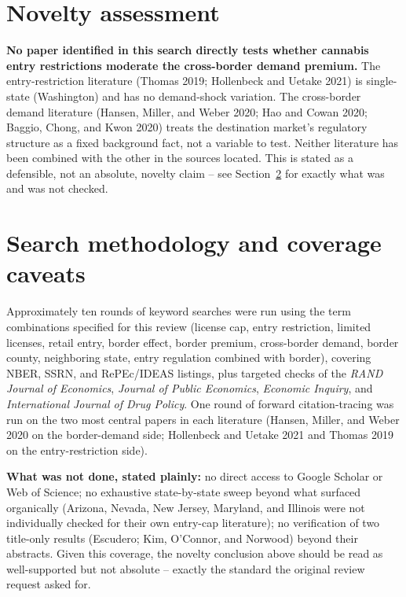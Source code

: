 \documentclass[11pt]{article}
\begin{document}
\section{Novelty assessment}
\textbf{No paper identified in this search directly tests whether cannabis entry restrictions moderate the
cross-border demand premium.} The entry-restriction literature (Thomas 2019; Hollenbeck and Uetake 2021) is
single-state (Washington) and has no demand-shock variation. The cross-border demand literature (Hansen,
Miller, and Weber 2020; Hao and Cowan 2020; Baggio, Chong, and Kwon 2020) treats the destination market's
regulatory structure as a fixed background fact, not a variable to test. Neither literature has been combined
with the other in the sources located. This is stated as a defensible, not an absolute, novelty claim -- see
Section~\ref{sec:methodology} for exactly what was and was not checked.

\section{Search methodology and coverage caveats}
\label{sec:methodology}
Approximately ten rounds of keyword searches were run using the term combinations specified for this review
(license cap, entry restriction, limited licenses, retail entry, border effect, border premium, cross-border
demand, border county, neighboring state, entry regulation combined with border), covering NBER, SSRN, and
RePEc/IDEAS listings, plus targeted checks of the \emph{RAND Journal of Economics}, \emph{Journal of Public
Economics}, \emph{Economic Inquiry}, and \emph{International Journal of Drug Policy}. One round of forward
citation-tracing was run on the two most central papers in each literature (Hansen, Miller, and Weber 2020 on
the border-demand side; Hollenbeck and Uetake 2021 and Thomas 2019 on the entry-restriction side).

\textbf{What was not done, stated plainly:} no direct access to Google Scholar or Web of Science; no
exhaustive state-by-state sweep beyond what surfaced organically (Arizona, Nevada, New Jersey, Maryland, and
Illinois were not individually checked for their own entry-cap literature); no verification of two
title-only results (Escudero; Kim, O'Connor, and Norwood) beyond their abstracts. Given this coverage, the
novelty conclusion above should be read as well-supported but not absolute -- exactly the standard the
original review request asked for.
\end{document}
